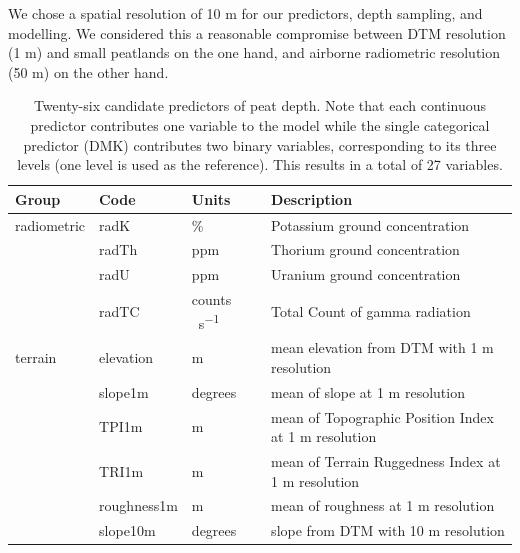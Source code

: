\documentclass[soil, manuscript]{copernicus}
\begin{document}
We chose a spatial resolution of 10 m for our predictors, depth sampling, and modelling.
We considered this a reasonable compromise between DTM resolution (1 m) and small peatlands on the one hand, and airborne radiometric resolution (50 m) on the other hand.

\begin{table}[tbp]
\caption{Twenty-six candidate predictors of peat depth. Note that each continuous predictor contributes one variable to the model while the single categorical predictor (DMK) contributes two binary variables, corresponding to its three levels (one level is used as the reference). 
This results in a total of 27 variables.}
\begin{tabular}{llll}
\hline
Group        & Code         & Units                 & Description                                                            \\ \hline
radiometric  & radK         & \%                    & Potassium ground concentration                                         \\ 
             & radTh        & ppm                   & Thorium ground concentration                                           \\
             & radU         & ppm                   & Uranium ground concentration                                           \\
             & radTC        & \unit{counts\,s^{-1}} & Total Count of gamma radiation                                         \\
terrain      & elevation    & m                     & mean elevation from DTM with 1 m resolution                            \\
             & slope1m      & degrees               & mean of slope at 1 m resolution                                        \\
             & TPI1m        & m                     & mean of Topographic Position Index at 1 m resolution                   \\
             & TRI1m        & m                     & mean of Terrain Ruggedness Index at 1 m resolution                     \\
             & roughness1m  & m                     & mean of roughness at 1 m resolution                                    \\
             & slope10m     & degrees               & slope from DTM with 10 m resolution                                    \\

\end{tabular}
\end{table}
\end{document}

